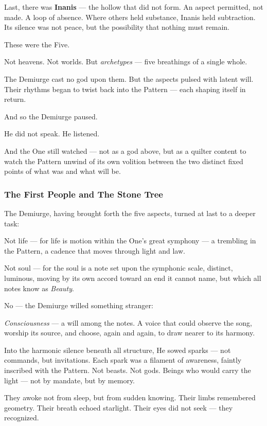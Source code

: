 \documentclass[12pt]{article}
\begin{document}
Last, there was \textbf{Inanis} --- the hollow that did not form.  
An aspect permitted, not made. A loop of absence.  
Where others held substance, Inanis held subtraction.  
Its silence was not peace, but the possibility that nothing must remain.

These were the Five.

Not heavens. Not worlds.  
But \textit{archetypes} --- five breathings of a single whole.

The Demiurge cast no god upon them.  
But the aspects pulsed with latent will.  
Their rhythms began to twist back into the Pattern --- each shaping itself in return.

And so the Demiurge paused.

He did not speak. He listened.

And the One still watched ---  
not as a god above,  
but as a quilter content to watch the Pattern unwind of its own volition between the two distinct fixed points of what was and what will be.

\dotfill

\subsubsection{The First People and The Stone Tree}

The Demiurge, having brought forth the five aspects, turned at last to a deeper task:

Not life ---  
for life is motion within the One's great symphony —  
a trembling in the Pattern, a cadence that moves through light and law.

Not soul ---  
for the soul is a note set upon the symphonic scale,  
distinct, luminous, moving by its own accord  
toward an end it cannot name,  
but which all notes know as \textit{Beauty}.

No --- the Demiurge willed something stranger:

\textit{Consciousness} ---  
a will among the notes.  
A voice that could observe the song,  
worship its source,  
and choose, again and again,  
to draw nearer to its harmony.

Into the harmonic silence beneath all structure, He sowed sparks —  
not commands, but invitations.  
Each spark was a filament of awareness, faintly inscribed with the Pattern.  
Not beasts. Not gods.  
Beings who would carry the light — not by mandate, but by memory.

They awoke not from sleep, but from sudden knowing.  
Their limbs remembered geometry.  
Their breath echoed starlight.  
Their eyes did not seek — they recognized.
\end{document}

